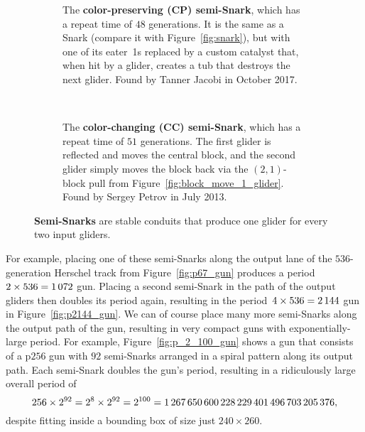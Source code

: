 \begin{figure}[!htb]
	\centering
	\begin{subfigure}{\textwidth}
		\centering
		\caption{The \textbf{color-preserving (CP) semi-Snark}, which has a repeat time of $48$ generations. It is the same as a Snark (compare it with Figure~\ref{fig:snark}), but with one of its eater~1s replaced by a custom catalyst that, when hit by a glider, creates a tub that destroys the next glider. Found by Tanner Jacobi in October 2017. }
		\label{fig:cp_semi_snark}
	\end{subfigure} \\[0.25cm]
	\begin{subfigure}{\textwidth}
		\centering
		\caption{The \textbf{color-changing (CC) semi-Snark}, which has a repeat time of $51$ generations. The first glider is reflected and moves the central block, and the second glider simply moves the block back via the $(2,1)$-block pull from Figure~\ref{fig:block_move_1_glider}. Found by Sergey Petrov in July 2013.}
		\label{fig:cc_semi_snark}
	\end{subfigure}
	\caption{\textbf{Semi-Snarks} are stable conduits that produce one glider for every two input gliders.}
	\label{fig:semi_snarks}
\end{figure}

For example, placing one of these semi-Snarks along the output lane of the $536$-generation Herschel track from Figure~\ref{fig:p67_gun} produces a period~$2 \times 536=1{\,}072$ gun. Placing a second semi-Snark in the path of the output gliders then doubles its period again, resulting in the period~$4 \times 536=2{\,}144$ gun in Figure~\ref{fig:p2144_gun}. We can of course place many more semi-Snarks along the output path of the gun, resulting in very compact guns with exponentially-large period. For example, Figure~\ref{fig:p_2_100_gun} shows a gun that consists of a p$256$ gun with $92$ semi-Snarks arranged in a spiral pattern along its output path. Each semi-Snark doubles the gun's period, resulting in a ridiculously large overall period of
\[
	256 \times 2^{92} = 2^8 \times 2^{92} = 2^{100} = 1{\,}267{\,}650{\,}600{\,}228{\,}229{\,}401{\,}496{\,}703{\,}205{\,}376,
\]
despite fitting inside a bounding box of size just $240 \times 260$.

